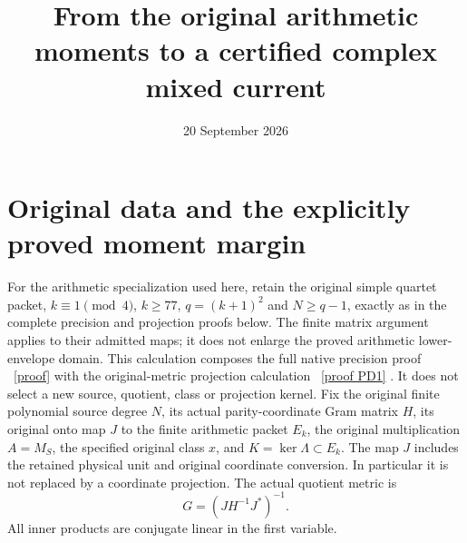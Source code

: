 \documentclass[11pt]{article}
\title{From the original arithmetic moments to a certified complex mixed current}
\author{}\date{20 September 2026}
\begin{document}
\maketitle

\section{Original data and the explicitly proved moment margin}
For the arithmetic specialization used here, retain the original simple
quartet packet, $k\equiv1\pmod4$, $k\ge77$, $q=(k+1)^2$ and
$N\ge q-1$, exactly as in the complete precision and projection
proofs below. The finite matrix argument applies to their admitted
maps; it does not enlarge the proved arithmetic lower-envelope domain.
This calculation composes the full native precision proof
\cite{precision}%
~\href{https://github.com/KokunoYumeto/zeta-function-research-reader/blob/5992ad50c0f2a06921f1fcaded7b4e38097c0739/workbenches/splitzero-tandem/continuations/20260920-original-kernel-mixed-determinants/providers/NATIVE_MOMENT_PRECISION.tex\#L1}{[proof]}%
{} with the original-metric projection calculation
\cite{projection}%
~\href{https://github.com/KokunoYumeto/zeta-function-research-reader/blob/5992ad50c0f2a06921f1fcaded7b4e38097c0739/workbenches/splitzero-tandem/continuations/20260920-original-kernel-mixed-determinants/providers/PROJECTION_PHASE_RETURN.tex\#L25}{[proof PD1]}%
{}. It does not select a new source, quotient, class or
projection kernel. Fix the original finite polynomial source degree $N$,
its actual parity-coordinate Gram matrix $H$, its original onto map
$J$ to the finite arithmetic packet $E_k$, the original multiplication
$A=M_S$, the specified original class $x$, and $K=\ker\Lambda\subset E_k$.
The map $J$ includes the retained physical unit and original coordinate
conversion. In particular it is not replaced by a coordinate projection.
The actual quotient metric is
\[
 G=(JH^{-1}J^*)^{-1}.                                      \tag{MC1}
\]
All inner products are conjugate linear in the first variable.
\end{document}
